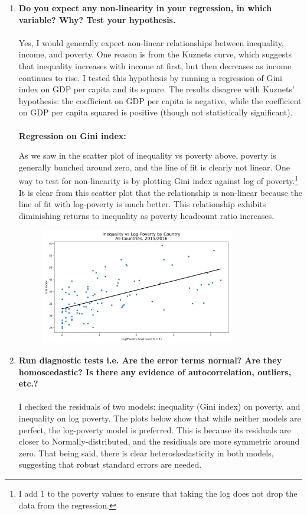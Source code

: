 \documentclass[12pt]{article}
\begin{document}
\begin{enumerate}
    \item \textbf{Do you expect any non-linearity in your regression, in which variable? Why? Test your hypothesis.}
    \\\\
    Yes, I would generally expect non-linear relationships between inequality, income, and poverty. One reason is from the Kuznets curve, which suggests that inequality increases with income at first, but then decreases as income continues to rise. I tested this hypothesis by running a regression of Gini index on GDP per capita and its square. The results disagree with Kuznets' hypothesis: the coefficient on GDP per capita is negative, while the coefficient on GDP per capita squared is positive (though not statistically significant).
    \\\\
    \textbf{Regression on Gini index:}
    \footnotesize
    
    \normalsize
    As we saw in the scatter plot of inequality vs poverty above, poverty is generally bunched around zero, and the line of fit is clearly not linear. One way to test for non-linearity is by plotting Gini index against log of poverty.\footnote{I add 1 to the poverty values to ensure that taking the log does not drop the data from the regression.} It is clear from this scatter plot that the relationship is non-linear because the line of fit with log-poverty is much better. This relationship exhibits diminishing returns to inequality as poverty headcount ratio increases.
    \begin{figure}[H]
        \centering
        \includegraphics[width=0.8\textwidth]{./output/Scatterplot Inequality vs Log-Poverty.png}
    \end{figure}

    \item \textbf{Run diagnostic tests i.e. Are the error terms normal? Are they homoscedastic? Is there any evidence of autocorrelation, outliers, etc.?}
    \\\\
    I checked the residuals of two models: inequality (Gini index) on poverty, and inequality on log poverty. The plots below show that while neither models are perfect, the log-poverty model is preferred. This is because its residuals are closer to Normally-distributed, and the residiuals are more symmetric around zero. That being said, there is clear heteroskedasticity in both models, suggesting that robust standard errors are needed.
    

\end{enumerate}
\end{document}
